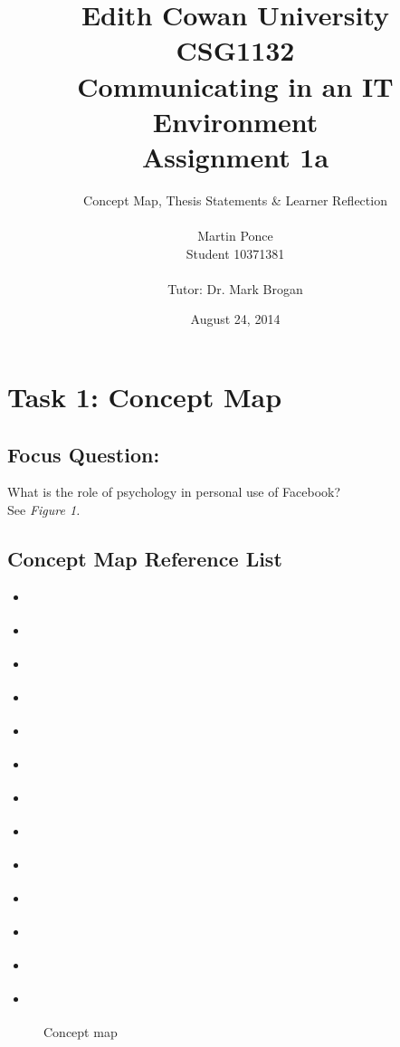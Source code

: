 \documentclass[12pt,a4paper]{report}
\title{Edith Cowan University\\CSG1132\\Communicating in an IT Environment\\Assignment 1a}
\author{Concept Map, Thesis Statements \& Learner Reflection\\\\
		Martin Ponce\\Student 10371381\\\\Tutor: Dr. Mark Brogan}
\date{August 24, 2014}
\begin{document}
\maketitle

\tableofcontents
\thispagestyle{fancy}

\newpage
\section*{\textsf{Task 1: Concept Map}}

\subsection*{\textsf{Focus Question:}}
What is the role of psychology in personal use of Facebook?\\

See \emph{Figure 1.}

\subsection*{\textsf{Concept Map Reference List}}
\begin{itemize}
\item \citet*{Pai2013}
\item \citet*{McAndrew2012}
\item \citet*{Nadkarni2012}
\item \citet*{Moore2012}
\item \citet*{Ross2009}
\item \citet*{Toma2013}
\item \citet*{Ellison2007}
\item \citet*{Park2011}
\item \citet*{Anderson2012}
\item \citet*{Ku2013}
\item \citet*{Rosen2013}
\item \citet*{Trottier2012}
\item \citet*{Kwan2013}
\end{itemize}

\newpage
\begin{landscape}
	\begin{figure} %
		\centering
		\caption{Concept map}
	\end{figure}
	
\end{landscape}
\end{document}

